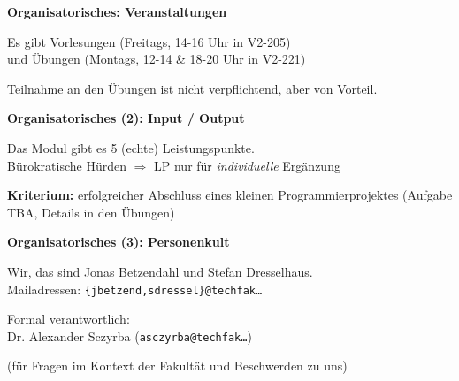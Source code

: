 \documentclass[unknownkeysallowed]{beamer}
\begin{document}
  
  \begin{frame}
    \Large\textbf{Organisatorisches: Veranstaltungen}\bigskip \normalsize
    
    Es gibt Vorlesungen (Freitags, 14-16 Uhr in V2-205)\\
    und Übungen (Montags, 12-14 \& 18-20 Uhr in V2-221)\bigskip
	
	Teilnahme an den Übungen ist nicht verpflichtend, aber von Vorteil.  
  \end{frame}
  
  
  \begin{frame}
    \Large\textbf{Organisatorisches (2): Input / Output}\bigskip \normalsize
    
    Das Modul gibt es 5 (echte) Leistungspunkte.\\
    Bürokratische Hürden $\Rightarrow$ LP nur für \emph{individuelle} Ergänzung \bigskip
    
    \textbf{Kriterium:} erfolgreicher Abschluss eines kleinen Programmierprojektes
    (Aufgabe TBA, Details in den Übungen)
  \end{frame}
  
  
  \begin{frame}
    \Large\textbf{Organisatorisches (3): Personenkult}\bigskip \normalsize

	Wir, das sind Jonas Betzendahl und Stefan Dresselhaus.\\
	Mailadressen: \texttt{\{jbetzend,sdressel\}@techfak\dots}\\ \bigskip
    
    Formal verantwortlich:\\Dr. Alexander Sczyrba (\texttt{asczyrba@techfak\dots})
    
    (für Fragen im Kontext der Fakultät und Beschwerden zu uns)
  \end{frame}
  
\end{document}
